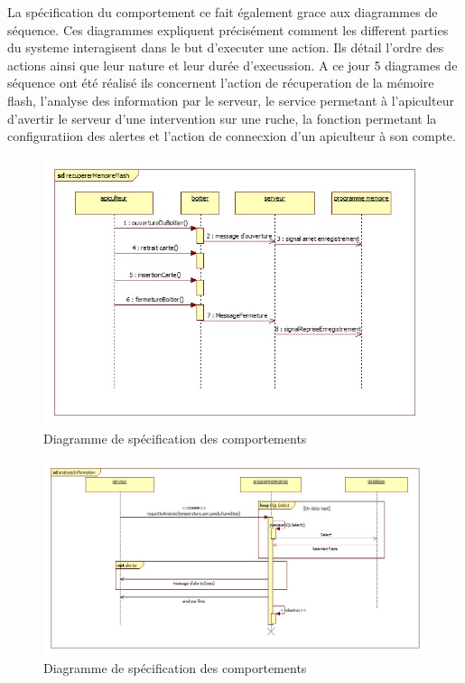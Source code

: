 La spécification du comportement ce fait également grace aux diagrammes de séquence. Ces diagrammes expliquent précisément comment les different parties du systeme interagisent dans le but d'executer une action. Ils détail l'ordre des actions ainsi que leur nature et leur durée d'execussion. A ce jour 5 diagrames de séquence ont été réalisé ils concernent l'action de récuperation de la mémoire flash, l'analyse des information par le serveur, le service permetant à l'apiculteur d'avertir le serveur d'une intervention sur une ruche, la fonction permetant la configuratiion des alertes et l'action de connecxion d'un apiculteur à son compte.
\begin{figure}[h!]
\centering\includegraphics[scale=0.7]{recupererMemoireFlash.jpg}
\caption{\label{fig:sp_comp} Diagramme de spécification des comportements}
\end{figure}
\begin{figure}[h!]
\centering\includegraphics[scale=0.7]{analyserInformation.jpg}
\caption{\label{fig:sp_comp} Diagramme de spécification des comportements}
\end{figure}
